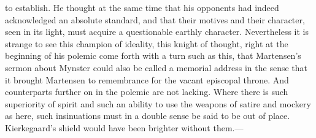 \documentclass[12pt,a4paper]{book}
\begin{document}
to establish. He thought at the same time that his opponents had indeed
acknowledged an absolute standard, and that their motives and their
character, seen in its light, must acquire a questionable earthly
character. Nevertheless it is strange to see this champion of ideality,
this knight of thought, right at the beginning of his polemic come forth
with a turn such as this, that Martensen's sermon about Mynster could
also be called a memorial address in the sense that it brought Martensen
to remembrance for the vacant episcopal throne. And counterparts further
on in the polemic are not lacking. Where there is such superiority of
spirit and such an ability to use the weapons of satire and mockery as
here, such insinuations must in a double sense be said to be out of
place. Kierkegaard's shield would have been brighter without them.---
\end{document}
